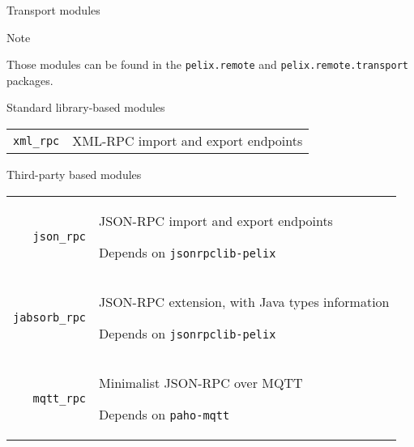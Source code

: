 \begin{frame}{Transport modules}

\begin{exampleblock}{Note}
\begin{small}
Those modules can be found in the \texttt{pelix.remote} and \texttt{pelix.remote.transport} packages.
\end{small}
\end{exampleblock}

\begin{block}{Standard library-based modules}
\begin{small}
\begin{tabular}{rp{}}
\texttt{xml\_rpc} & XML-RPC import and export endpoints \\
\end{tabular}
\end{small}
\end{block}

\begin{block}{Third-party based modules}
\begin{small}
\begin{tabular}{rp{}}
\texttt{json\_rpc} & JSON-RPC import and export endpoints \par Depends on \texttt{jsonrpclib-pelix} \\
\texttt{jabsorb\_rpc} & JSON-RPC extension, with Java types information \par Depends on \texttt{jsonrpclib-pelix} \\
\texttt{mqtt\_rpc} & Minimalist JSON-RPC over MQTT \par Depends on \texttt{paho-mqtt} \\
\end{tabular}
\end{small}
\end{block}
\end{frame}
